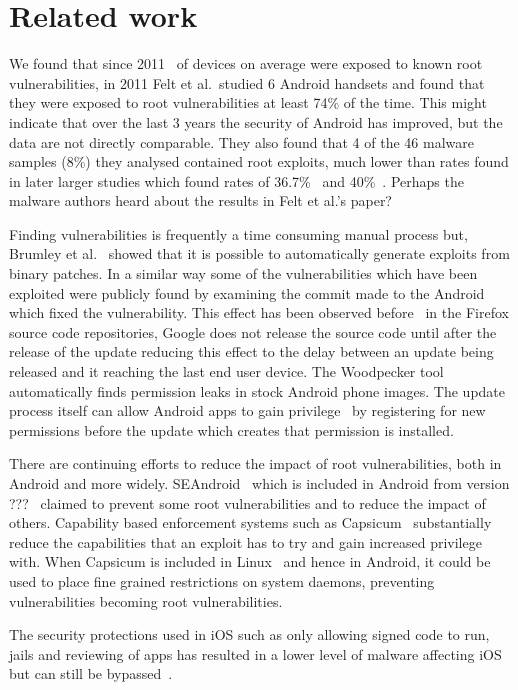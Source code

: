 \documentclass[conference,a4paper,twoside]{IEEEtran}
\begin{document}
\section{Related work}
\label{sec:related}
We found that since 2011 \daMeanInsecurityPerc\ of devices on average were exposed to known root vulnerabilities, in 2011 Felt et al.\ studied 6 Android handsets and found that they were exposed to root vulnerabilities at least 74\% of the time.
This might indicate that over the last 3 years the security of Android has improved, but the data are not directly comparable.
They also found that 4 of the 46 malware samples (8\%) they analysed contained root exploits, much lower than rates found in later larger studies which found rates of 36.7\%~\cite{Zhou2012b} and 40\%~\cite{Zhou2012a}.
Perhaps the malware authors heard about the results in Felt et al.'s paper?

Finding vulnerabilities is frequently a time consuming manual process but, Brumley et al.~\cite{Brumley2008} showed that it is possible to automatically generate exploits from binary patches.
In a similar way some of the vulnerabilities which have been exploited were publicly found by examining the commit made to the Android which fixed the vulnerability.
This effect has been observed before~\cite{Barth2011} in the Firefox source code repositories, Google does not release the source code until after the release of the update reducing this effect to the delay between an update being released and it reaching the last end user device.
The Woodpecker tool~\cite{Grace2012} automatically finds permission leaks in stock Android phone images.
The update process itself can allow Android apps to gain privilege~\cite{Xing2014} by registering for new permissions before the update which creates that permission is installed.


There are continuing efforts to reduce the impact of root vulnerabilities, both in Android and more widely.
SEAndroid~\cite{Smalley2013} which is included in Android from version ???~\cite{TODO} claimed to prevent some root vulnerabilities and to reduce the impact of others.
Capability based enforcement systems such as Capsicum~\cite{Watson2010} substantially reduce the capabilities that an exploit has to try and gain increased privilege with.
When Capsicum is included in Linux~\cite{TODO} and hence in Android, it could be used to place fine grained restrictions on system daemons, preventing vulnerabilities becoming root vulnerabilities.

The security protections used in iOS such as only allowing signed code to run, jails and reviewing of apps has resulted in a lower level of malware affecting iOS~\cite{TODO} but can still be bypassed~\cite{Wang2013a}. %
\end{document}
